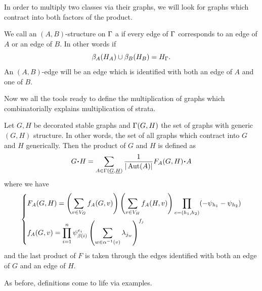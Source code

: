 \documentclass[12pt]{memoir}
\begin{document}
In order to multiply two classes via their graphs, we will look for graphs which contract into both factors of the product. 

\begin{Def}
    We call an $(A,B)$-structure on $\Gamma$ a  if every edge of $\Gamma$ corresponds to an edge of $A$ or an edge of $B$. In other words if 
    $$\beta_A(H_A)\cup\beta_B(H_B)=H_\Gamma.$$
    An $(A,B)$-edge will be an edge which is identified with both an edge of $A$ and one of $B$.
\end{Def}

Now we all the tools ready to define the multiplication of graphs which combinatorially explains multiplication of strata.

\begin{Def}
    Let $G,H$ be decorated stable graphs and $\Gamma(G,H)$ the set of graphs with generic $(G,H)$ structure. In other words, the set of all graphs which contract into $G$ and $H$ generically. Then the product of $G$ and $H$ is defined as 
    $$G\. H=\sum_{A\in\Ga(\un G,\un H)}\frac{1}{|\Aut(A)|}F_A(G,H)\.A$$
    where we have 
    $$
    \left\lbrace
    \begin{aligned}
        &F_A(G,H)=\left(\sum_{v\in V_G}f_A(G,v)\right)\left(\sum_{v\in V_H}f_A(H,v)\right)\prod_{e=(h_1,h_2)}(-\psi_{h_1}-\psi_{h_2})\\
        &f_A(G,v)=\prod_{i=1}^{n}\psi_{\beta(i)}^{e_i}\left(\sum_{w\in\alpha^{-1}(v)}\lambda_{j_w}\right)^{f_j}
    \end{aligned}
    \right.
    $$
    and the last product of $F$ is taken through the edges identified with both an edge of $G$ and an edge of $H$.
\end{Def}

As before, definitions come to life via examples. 
\end{document}
